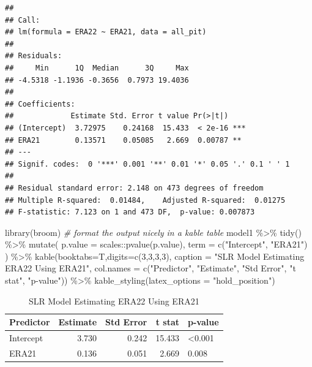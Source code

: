 \documentclass[
  11pt,
]{book}
\newenvironment{Shaded}{\begin{snugshade}}{\end{snugshade}}
\newcommand{\AttributeTok}[1]{\textcolor[rgb]{0.77,0.63,0.00}{#1}}
\newcommand{\CommentTok}[1]{\textcolor[rgb]{0.56,0.35,0.01}{\textit{#1}}}
\newcommand{\DecValTok}[1]{\textcolor[rgb]{0.00,0.00,0.81}{#1}}
\newcommand{\FunctionTok}[1]{\textcolor[rgb]{0.00,0.00,0.00}{#1}}
\newcommand{\NormalTok}[1]{#1}
\newcommand{\SpecialCharTok}[1]{\textcolor[rgb]{0.00,0.00,0.00}{#1}}
\newcommand{\StringTok}[1]{\textcolor[rgb]{0.31,0.60,0.02}{#1}}
\theoremstyle{definition}
\theoremstyle{definition}
\theoremstyle{definition}
\theoremstyle{definition}
\theoremstyle{remark}
\begin{document}
\begin{verbatim}
## 
## Call:
## lm(formula = ERA22 ~ ERA21, data = all_pit)
## 
## Residuals:
##     Min      1Q  Median      3Q     Max 
## -4.5318 -1.1936 -0.3656  0.7973 19.4036 
## 
## Coefficients:
##             Estimate Std. Error t value Pr(>|t|)    
## (Intercept)  3.72975    0.24168  15.433  < 2e-16 ***
## ERA21        0.13571    0.05085   2.669  0.00787 ** 
## ---
## Signif. codes:  0 '***' 0.001 '**' 0.01 '*' 0.05 '.' 0.1 ' ' 1
## 
## Residual standard error: 2.148 on 473 degrees of freedom
## Multiple R-squared:  0.01484,    Adjusted R-squared:  0.01275 
## F-statistic: 7.123 on 1 and 473 DF,  p-value: 0.007873
\end{verbatim}

\begin{Shaded}
\begin{Highlighting}[]
\FunctionTok{library}\NormalTok{(broom)}
\CommentTok{\# format the output nicely in a kable table}
\NormalTok{model1 }\SpecialCharTok{\%\textgreater{}\%} \FunctionTok{tidy}\NormalTok{() }\SpecialCharTok{\%\textgreater{}\%}
  \FunctionTok{mutate}\NormalTok{(}
    \AttributeTok{p.value =}\NormalTok{ scales}\SpecialCharTok{::}\FunctionTok{pvalue}\NormalTok{(p.value),}
    \AttributeTok{term =} \FunctionTok{c}\NormalTok{(}\StringTok{"Intercept"}\NormalTok{, }\StringTok{"ERA21"}\NormalTok{)}
\NormalTok{  ) }\SpecialCharTok{\%\textgreater{}\%}
  \FunctionTok{kable}\NormalTok{(}\AttributeTok{booktabs=}\NormalTok{T,}\AttributeTok{digits=}\FunctionTok{c}\NormalTok{(}\DecValTok{3}\NormalTok{,}\DecValTok{3}\NormalTok{,}\DecValTok{3}\NormalTok{,}\DecValTok{3}\NormalTok{), }
        \AttributeTok{caption =} \StringTok{"SLR Model Estimating ERA22 Using ERA21"}\NormalTok{,}
        \AttributeTok{col.names =} \FunctionTok{c}\NormalTok{(}\StringTok{"Predictor"}\NormalTok{, }\StringTok{"Estimate"}\NormalTok{, }\StringTok{"Std Error"}\NormalTok{, }\StringTok{"t stat"}\NormalTok{, }\StringTok{"p{-}value"}\NormalTok{)) }\SpecialCharTok{\%\textgreater{}\%}
  \FunctionTok{kable\_styling}\NormalTok{(}\AttributeTok{latex\_options =} \StringTok{"hold\_position"}\NormalTok{)}
\end{Highlighting}
\end{Shaded}

\begin{table}[!h]

\caption{\label{tab:unnamed-chunk-188}SLR Model Estimating ERA22 Using ERA21}
\centering
\begin{tabular}[t]{lrrrl}
\toprule
Predictor & Estimate & Std Error & t stat & p-value\\
\midrule
Intercept & 3.730 & 0.242 & 15.433 & <0.001\\
ERA21 & 0.136 & 0.051 & 2.669 & 0.008\\
\bottomrule
\end{tabular}
\end{table}
\end{document}
